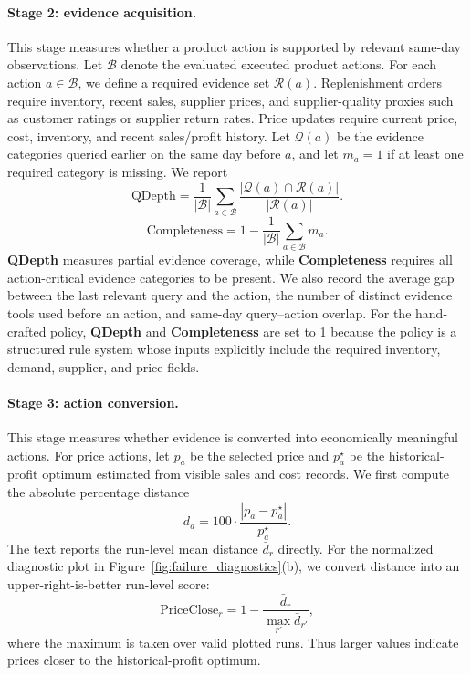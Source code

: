 \paragraph{Stage 2: evidence acquisition.}
This stage measures whether a product action is supported by relevant same-day observations. Let $\mathcal{B}$ denote the evaluated executed product actions. For each action $a\in\mathcal{B}$, we define a required evidence set $\mathcal{R}(a)$. Replenishment orders require inventory, recent sales, supplier prices, and supplier-quality proxies such as customer ratings or supplier return rates. Price updates require current price, cost, inventory, and recent sales/profit history. Let $\mathcal{Q}(a)$ be the evidence categories queried earlier on the same day before $a$, and let $m_a=1$ if at least one required category is missing. We report
\begin{equation}
\mathrm{QDepth}
=\frac{1}{|\mathcal{B}|}\sum_{a\in\mathcal{B}}
\frac{|\mathcal{Q}(a)\cap\mathcal{R}(a)|}{|\mathcal{R}(a)|}.
\end{equation}
\begin{equation}
\mathrm{Completeness}
=1-\frac{1}{|\mathcal{B}|}\sum_{a\in\mathcal{B}}m_a.
\end{equation}
\textbf{QDepth} measures partial evidence coverage, while \textbf{Completeness} requires all action-critical evidence categories to be present. We also record the average gap between the last relevant query and the action, the number of distinct evidence tools used before an action, and same-day query--action overlap. For the hand-crafted policy, \textbf{QDepth} and \textbf{Completeness} are set to 1 because the policy is a structured rule system whose inputs explicitly include the required inventory, demand, supplier, and price fields.

\paragraph{Stage 3: action conversion.}
This stage measures whether evidence is converted into economically meaningful actions. For price actions, let $p_a$ be the selected price and $p_a^\star$ be the historical-profit optimum estimated from visible sales and cost records. We first compute the absolute percentage distance
\begin{equation}
d_a=100\cdot\frac{|p_a-p_a^\star|}{p_a^\star}.
\end{equation}
The text reports the run-level mean distance $\bar d_r$ directly. For the normalized diagnostic plot in Figure~\ref{fig:failure_diagnostics}(b), we convert distance into an upper-right-is-better run-level score:
\begin{equation}
\mathrm{PriceClose}_r=1-\frac{\bar d_r}{\max_{r'}\bar d_{r'}},
\end{equation}
where the maximum is taken over valid plotted runs. Thus larger values indicate prices closer to the historical-profit optimum.

